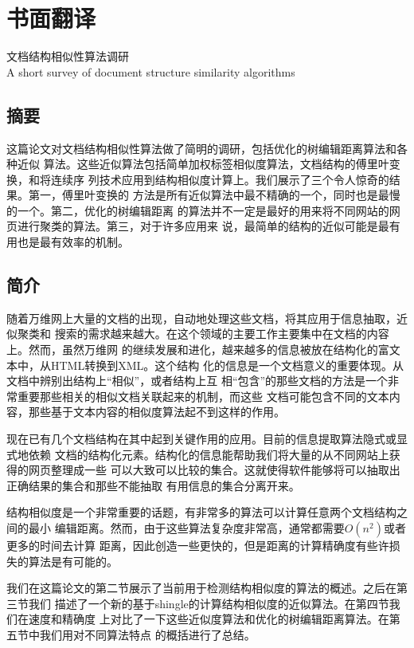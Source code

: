 
\chapter{书面翻译}
\label{chap:translation}
\begin{center}  
  {文档结构相似性算法调研\\
    A short survey of document structure similarity algorithms}
\end{center}

\section*{摘要}
  这篇论文对文档结构相似性算法做了简明的调研，包括优化的树编辑距离算法和各种近似
  算法。这些近似算法包括简单加权标签相似度算法，文档结构的傅里叶变换，和将连续序
  列技术应用到结构相似度计算上。我们展示了三个令人惊奇的结果。第一，傅里叶变换的
  方法是所有近似算法中最不精确的一个，同时也是最慢的一个。第二，优化的树编辑距离
  的算法并不一定是最好的用来将不同网站的网页进行聚类的算法。第三，对于许多应用来
  说，最简单的结构的近似可能是最有用也是最有效率的机制。
\section{简介}
随着万维网上大量的文档的出现，自动地处理这些文档，将其应用于信息抽取，近似聚类和
搜索的需求越来越大。在这个领域的主要工作主要集中在文档的内容上。然而，虽然万维网
的继续发展和进化，越来越多的信息被放在结构化的富文本中，从HTML转换到XML。这个结构
化的信息是一个文档意义的重要体现。从文档中辨别出结构上“相似”，或者结构上互
相“包含”的那些文档的方法是一个非常重要那些相关的相似文档关联起来的机制，而这些
文档可能包含不同的文本内容，那些基于文本内容的相似度算法起不到这样的作用。

现在已有几个文档结构在其中起到关键作用的应用。目前的信息提取算法隐式或显式地依赖
文档的结构化元素。结构化的信息能帮助我们将大量的从不同网站上获得的网页整理成一些
可以大致可以比较的集合。这就使得软件能够将可以抽取出正确结果的集合和那些不能抽取
有用信息的集合分离开来。

结构相似度是一个非常重要的话题，有非常多的算法可以计算任意两个文档结构之间的最小
编辑距离。然而，由于这些算法复杂度非常高，通常都需要$O(n^2)$或者更多的时间去计算
距离，因此创造一些更快的，但是距离的计算精确度有些许损失的算法是有可能的。

我们在这篇论文的第二节展示了当前用于检测结构相似度的算法的概述。之后在第三节我们
描述了一个新的基于shingle的计算结构相似度的近似算法。在第四节我们在速度和精确度
上对比了一下这些近似度算法和优化的树编辑距离算法。在第五节中我们用对不同算法特点
的概括进行了总结。


